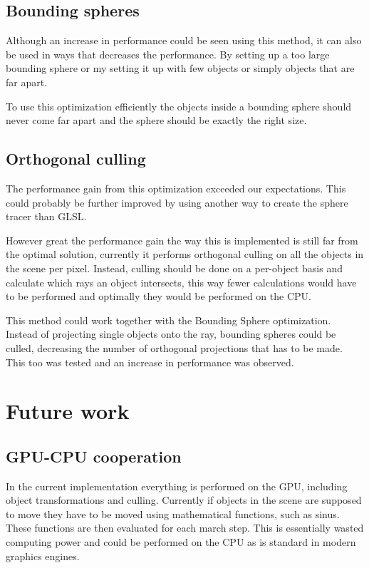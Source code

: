 
		\subsection{Bounding spheres}
			
			Although an increase in performance could be seen using this method,
			it can also be used in ways that decreases the performance. By
			setting up a too large bounding sphere or my setting it up with few
			objects or simply objects that are far apart.

			To use this optimization efficiently the objects inside a bounding 
			sphere should never come far apart and the sphere should be exactly 
			the right size.

		\subsection{Orthogonal culling}

			The performance gain from this optimization exceeded our 
			expectations. This could probably be further improved by using
			another way to create the sphere tracer than GLSL. 

			However great the performance gain the way this is implemented
			is still far from the optimal solution, currently it performs 
			orthogonal culling on all the objects in the scene per pixel. 
			Instead, culling should be done on a per-object basis and calculate
			which rays an object intersects, this way fewer calculations would
			have to be performed and optimally they would be performed on the
			CPU.

			This method could work together with the Bounding Sphere 
			optimization. Instead of projecting single objects onto the ray,
			bounding spheres could be culled, decreasing the number of 
			orthogonal projections that has to be made. This too was tested 
			and an increase in performance was observed.

	\section{Future work}

		\subsection{GPU-CPU cooperation}

			In the current implementation everything is performed on the GPU,
			including object transformations and culling. Currently if objects 
			in the scene are supposed to move they have to be moved using 
			mathematical functions, such as sinus. These functions are then 
			evaluated for each march step. This is essentially wasted computing 
			power and could be performed on the CPU as is standard in modern 
			graphics engines.


